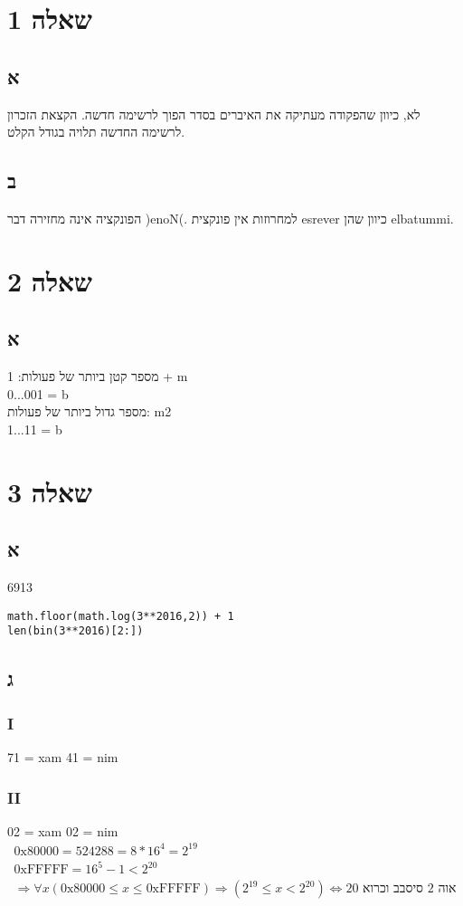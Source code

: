 \documentclass[a4paper]{article}
\begin{document}
\section*{שאלה 1}
\subsection*{א}
לא, כיוון שהפקודה מעתיקה את האיברים בסדר הפוך לרשימה חדשה. הקצאת הזכרון לרשימה החדשה תלויה בגודל הקלט.
\subsection*{ב}
הפונקציה אינה מחזירה דבר )enoN(. למחרוזות אין פונקצית esrever כיוון שהן elbatummi.
\section*{שאלה 2}
\subsection*{א}
מספר קטן ביותר של פעולות:
1 + m
\\
0...001 = b
\\
מספר גדול ביותר של פעולות:
m2
\\
1...11 = b
\\
\section*{שאלה 3}
\subsection*{א}
6913
\begin{lstlisting}
math.floor(math.log(3**2016,2)) + 1
len(bin(3**2016)[2:])
\end{lstlisting}
\subsection*{ג}
\subsubsection*{I}
71 = xam 41 = nim
\subsubsection*{II}
02 = xam 02 = nim
\begin{eqnarray*}
    \text{0x80000} = 524288 = 8*16^4 = 2^{19} \\
    \text{0xFFFFF} = 16^5 - 1 < 2^{20} \\
    \Rightarrow \forall x (\text{0x80000} \leq x \leq \text{0xFFFFF}) \Rightarrow (2^{19} \leq x < 2^{20}) \Leftrightarrow \text{
        20 אוה 2 סיסבב וכרוא}
\end{eqnarray*}
\end{document}
